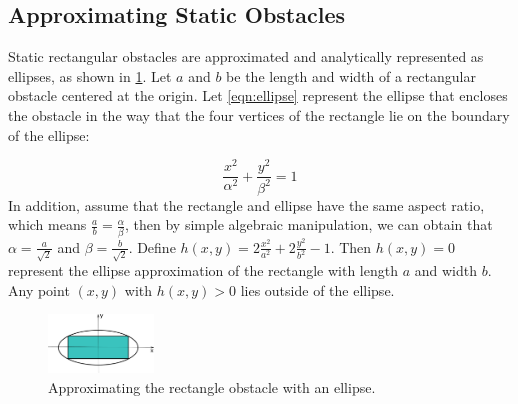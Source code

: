 \documentclass[journal]{IEEEtran}
\begin{document}
	\subsection{Approximating Static Obstacles}\label{subsec:ellip_approx}
	Static rectangular obstacles are approximated and analytically represented as ellipses, as shown in \cref{fig:approx_ellipse}.
	Let $a$ and $b$ be the length and width of a rectangular obstacle centered at the origin.
	Let \cref{eqn:ellipse} represent the ellipse that encloses the obstacle in the way that the four vertices of the rectangle lie on the boundary of the ellipse:
	\addtocounter{equation}{-2}
	
	\small	\begin{equation}\label{eqn:ellipse}
	\frac{x^2}{\alpha^2}+\frac{y^2}{\beta^2}=1
	\end{equation} \normalsize
	In addition, assume that the rectangle and ellipse have the same aspect ratio, which means $\frac{a}{b}=\frac{\alpha}{\beta}$, then by simple algebraic manipulation, we can obtain that $\alpha=\frac{a}{\sqrt{2}}$ and $\beta=\frac{b}{\sqrt{2}}$.
	Define $h(x,y)=2\frac{x^2}{a^2}+2\frac{y^2}{b^2}-1.$
	Then $h(x,y)=0$ represent the ellipse approximation of the rectangle with length $a$ and width $b$.
	Any point $(x,y)$ with $h(x,y)>0$ lies outside of the ellipse.
	
	\begin{figure}
		\centering		
		\includegraphics[width=0.25\textwidth]{figures/approx_ellipse}
		\caption{Approximating the rectangle obstacle with an ellipse.}
		\label{fig:approx_ellipse}
	\end{figure}
	
	
	
	\addtolength{\textheight}{-12cm}   %
	
	
	
\end{document}

